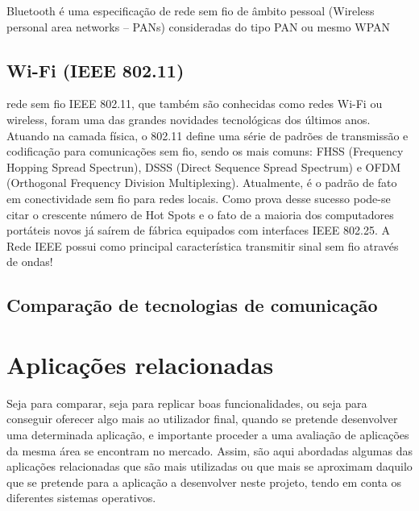 Bluetooth é uma especificação de rede sem fio de âmbito pessoal (Wireless personal area networks – PANs) consideradas do tipo PAN ou mesmo WPAN


\subsection{Wi-Fi (IEEE 802.11)}

rede sem fio IEEE 802.11, que também são conhecidas como redes Wi-Fi ou wireless, foram uma das grandes novidades tecnológicas dos últimos anos. Atuando na camada física, o 802.11 define uma série de padrões de transmissão e codificação para comunicações sem fio, sendo os mais comuns: FHSS (Frequency Hopping Spread Spectrun), DSSS (Direct Sequence Spread Spectrum) e OFDM (Orthogonal Frequency Division Multiplexing). Atualmente, é o padrão de fato em conectividade sem fio para redes locais. Como prova desse sucesso pode-se citar o crescente número de Hot Spots e o fato de a maioria dos computadores portáteis novos já saírem de fábrica equipados com interfaces IEEE 802.25. A Rede IEEE possui como principal característica transmitir sinal sem fio através de ondas!




\subsection{Comparação de tecnologias de comunicação}












\newpage
\section{Aplicações relacionadas}



Seja para comparar, seja para replicar boas funcionalidades, ou seja para conseguir oferecer algo mais ao utilizador final, quando se pretende desenvolver uma determinada aplicação, e
importante proceder a uma avaliação de aplicações da mesma área se encontram no mercado.
Assim, são aqui abordadas algumas das aplicações relacionadas que são mais utilizadas ou que mais se aproximam daquilo que se pretende para a aplicação a desenvolver neste projeto,
tendo em conta os diferentes sistemas operativos.




